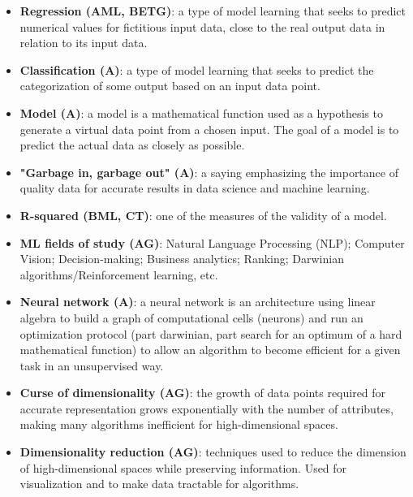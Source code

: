 \documentclass{article}
\begin{document}
\begin{itemize}

	\item \textbf{Regression (AML, BETG)}: a type of model learning that seeks to predict numerical values for fictitious input data, close to the real output data in relation to its input data.

	\item \textbf{Classification (A)}: a type of model learning that seeks to predict the categorization of some output based on an input data point.

	\item \textbf{Model (A)}: a model is a mathematical function used as a hypothesis to generate a virtual data point from a chosen input. The goal of a model is to predict the actual data as closely as possible.

	\item \textbf{"Garbage in, garbage out" (A)}: a saying emphasizing the importance of quality data for accurate results in data science and machine learning.

	\item \textbf{R-squared (BML, CT)}: one of the measures of the validity of a model.

	\item \textbf{ML fields of study (AG)}: Natural Language Processing (NLP); Computer Vision; Decision-making; Business analytics; Ranking; Darwinian algorithms/Reinforcement learning, etc.

	\item \textbf{Neural network (A)}: a neural network is an architecture using linear algebra to build a graph of computational cells (neurons) and run an optimization protocol (part darwinian, part search for an optimum of a hard mathematical function) to allow an algorithm to become efficient for a given task in an unsupervised way.

	\item \textbf{Curse of dimensionality (AG)}: the growth of data points required for accurate representation grows exponentially with the number of attributes, making many algorithms inefficient for high-dimensional spaces.

	\item \textbf{Dimensionality reduction (AG)}: techniques used to reduce the dimension of high-dimensional spaces while preserving information. Used for visualization and to make data tractable for algorithms.

\end{itemize}
\end{document}
